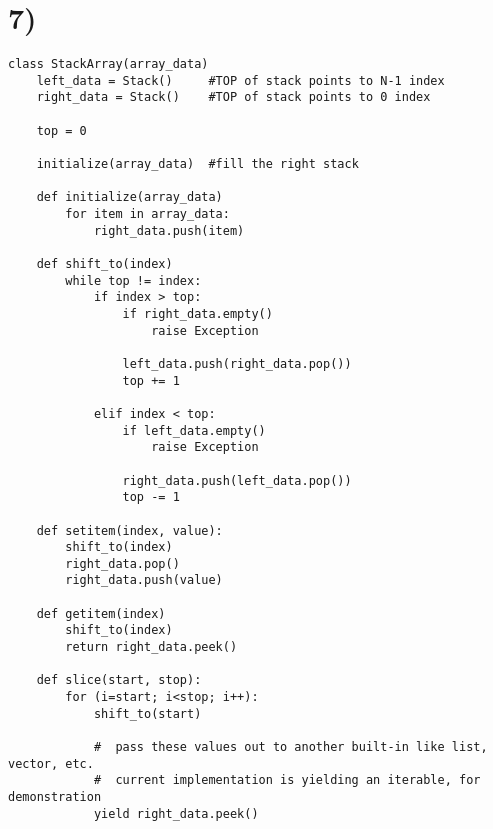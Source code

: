 \documentclass[a4paper,11pt]{article}
\begin{document}
\section*{7)}
\begin{verbatim}
class StackArray(array_data)
    left_data = Stack()     #TOP of stack points to N-1 index
    right_data = Stack()    #TOP of stack points to 0 index

    top = 0

    initialize(array_data)  #fill the right stack

    def initialize(array_data)
        for item in array_data:
            right_data.push(item)

    def shift_to(index)
        while top != index:
            if index > top:
                if right_data.empty()
                    raise Exception
                    
                left_data.push(right_data.pop())
                top += 1
                
            elif index < top:
                if left_data.empty()
                    raise Exception
                     
                right_data.push(left_data.pop())
                top -= 1
               
    def setitem(index, value):
        shift_to(index)
        right_data.pop()
        right_data.push(value)
        
    def getitem(index)
        shift_to(index)
        return right_data.peek()
               
    def slice(start, stop):
        for (i=start; i<stop; i++):
            shift_to(start)
            
            #  pass these values out to another built-in like list, vector, etc.
            #  current implementation is yielding an iterable, for demonstration
            yield right_data.peek()   
\end{verbatim}

\end{document}
